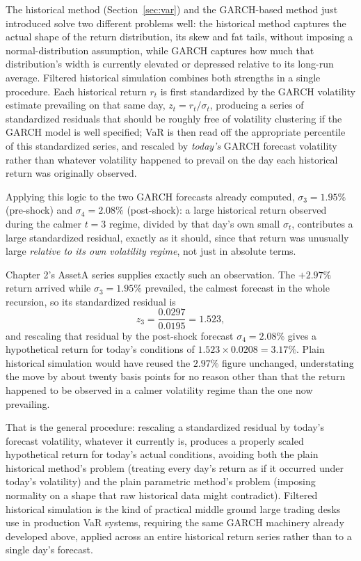 \documentclass[../ai_in_finance]{subfiles}
\begin{document}
The historical method (Section~\ref{sec:var}) and the GARCH-based method just introduced solve two different problems well: the historical method captures the actual shape of the return distribution, its skew and fat tails, without imposing a normal-distribution assumption, while GARCH captures how much that distribution's width is currently elevated or depressed relative to its long-run average.
Filtered historical simulation combines both strengths in a single procedure. Each historical return $r_t$ is first standardized by the GARCH volatility estimate prevailing on that same day, $z_t = r_t/\sigma_t$, producing a series of standardized residuals that should be roughly free of volatility clustering if the GARCH model is well specified; VaR is then read off the appropriate percentile of this standardized series, and rescaled by \emph{today's} GARCH forecast volatility rather than whatever volatility happened to prevail on the day each historical return was originally observed.

Applying this logic to the two GARCH forecasts already computed, $\sigma_3=1.95\%$ (pre-shock) and $\sigma_4=2.08\%$ (post-shock): a large historical return observed during the calmer $t=3$ regime, divided by that day's own small $\sigma_t$, contributes a large standardized residual, exactly as it should, since that return was unusually large \emph{relative to its own volatility regime}, not just in absolute terms.

Chapter 2's AssetA series supplies exactly such an observation. The $+2.97\%$ return arrived while $\sigma_3 = 1.95\%$ prevailed, the calmest forecast in the whole recursion, so its standardized residual is
\begin{equation*}
z_3 = \frac{0.0297}{0.0195} = 1.523,
\end{equation*}
and rescaling that residual by the post-shock forecast $\sigma_4 = 2.08\%$ gives a hypothetical return for today's conditions of $1.523 \times 0.0208 = 3.17\%$. Plain historical simulation would have reused the $2.97\%$ figure unchanged, understating the move by about twenty basis points for no reason other than that the return happened to be observed in a calmer volatility regime than the one now prevailing.

That is the general procedure: rescaling a standardized residual by today's forecast volatility, whatever it currently is, produces a properly scaled hypothetical return for today's actual conditions, avoiding both the plain historical method's problem (treating every day's return as if it occurred under today's volatility) and the plain parametric method's problem (imposing normality on a shape that raw historical data might contradict). Filtered historical simulation is the kind of practical middle ground large trading desks use in production VaR systems, requiring the same GARCH machinery already developed above, applied across an entire historical return series rather than to a single day's forecast.
\end{document}
